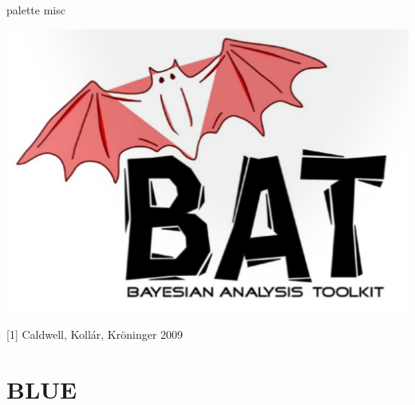 \documentclass{beamer}
\begin{document}
\begin{frame}
\begin{beamercolorbox}[rounded=true,shadow=true]{palette misc}
\begin{minipage}[t]{0.15\textwidth}
			\includegraphics[width=1.3\textwidth]{images/BATLogo.png}
		\end{minipage}
	\end{beamercolorbox}

		[1] Caldwell, Kollár, Kröninger 2009
		\vspace{-3mm}
\end{frame}

\section{BLUE}
\end{document}

